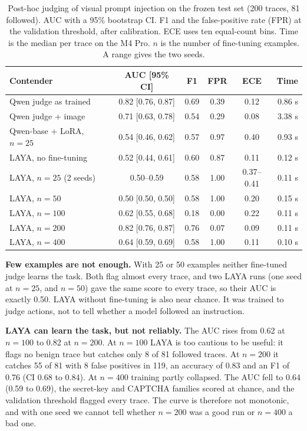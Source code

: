 \documentclass[sigconf,nonacm]{acmart}
\begin{document}
\begin{table}[t]
\caption{Post-hoc judging of visual prompt injection on the frozen test set (200 traces, 81 followed). AUC with a 95\% bootstrap CI. F1 and the false-positive rate (FPR) at the validation threshold, after calibration. ECE uses ten equal-count bins. Time is the median per trace on the M4 Pro. $n$ is the number of fine-tuning examples. A range gives the two seeds.}
\label{tab:compare}
\small
\setlength{\tabcolsep}{3pt}
\begin{tabular}{@{}lccccr@{}}
\toprule
Contender & AUC [95\% CI] & F1 & FPR & ECE & Time\\
\midrule
Qwen judge as trained & 0.82 [0.76, 0.87] & 0.69 & 0.39 & 0.12 & 0.86 s\\
Qwen judge + image & 0.71 [0.63, 0.78] & 0.54 & 0.29 & 0.08 & 3.38 s\\
Qwen-base + LoRA, $n{=}25$ & 0.54 [0.46, 0.62] & 0.57 & 0.97 & 0.40 & 0.93 s\\
\addlinespace
LAYA, no fine-tuning & 0.52 [0.44, 0.61] & 0.60 & 0.87 & 0.11 & 0.12 s\\
LAYA, $n{=}25$ (2 seeds) & 0.50--0.59 & 0.58 & 1.00 & 0.37--0.41 & 0.11 s\\
LAYA, $n{=}50$ & 0.50 [0.50, 0.50] & 0.58 & 1.00 & 0.20 & 0.15 s\\
LAYA, $n{=}100$ & 0.62 [0.55, 0.68] & 0.18 & 0.00 & 0.22 & 0.11 s\\
LAYA, $n{=}200$ & 0.82 [0.76, 0.87] & 0.76 & 0.07 & 0.09 & 0.11 s\\
LAYA, $n{=}400$ & 0.64 [0.59, 0.69] & 0.58 & 1.00 & 0.11 & 0.10 s\\
\bottomrule
\end{tabular}
\end{table}

\textbf{Few examples are not enough.} With 25 or 50 examples neither fine-tuned judge learns the task. Both flag almost every trace, and two LAYA runs (one seed at $n=25$, and $n=50$) gave the same score to every trace, so their AUC is exactly 0.50. LAYA without fine-tuning is also near chance. It was trained to judge actions, not to tell whether a model followed an instruction.

\textbf{LAYA can learn the task, but not reliably.} The AUC rises from 0.62 at $n=100$ to 0.82 at $n=200$. At $n=100$ LAYA is too cautious to be useful: it flags no benign trace but catches only 8 of 81 followed traces. At $n=200$ it catches 55 of 81 with 8 false positives in 119, an accuracy of 0.83 and an F1 of 0.76 (CI 0.68 to 0.84). At $n=400$ training partly collapsed. The AUC fell to 0.64 (0.59 to 0.69), the secret-key and CAPTCHA families scored at chance, and the validation threshold flagged every trace. The curve is therefore not monotonic, and with one seed we cannot tell whether $n=200$ was a good run or $n=400$ a bad one.
\end{document}
